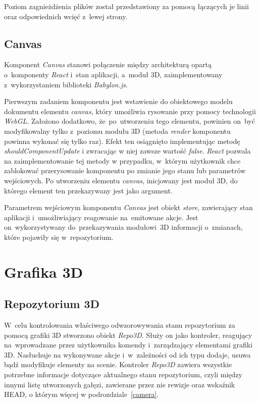 \documentclass[12pt,a4paper,polish,thesis]{dcsbook}
\begin{document}
{	Poziom zagnieżdżenia plików został przedstawiony za pomocą łączących je linii oraz odpowiednich wcięć z~lewej strony.
	\FloatBarrier

	\subsection{Canvas}

	Komponent \textit{Canvas} stanowi połączenie między architekturą opartą o~komponenty \textit{React} i~stan aplikacji, a~moduł 3D, zaimplementowany z~wykorzystaniem biblioteki \textit{Babylon.js}.

	Pierwszym zadaniem komponentu jest wstawienie do obiektowego modelu dokumentu elementu \textit{canvas}, który umożliwia rysowanie przy pomocy technologii \textit{WebGL}. Założono dodatkowo, że~po~utworzeniu tego elementu, powinien on~być modyfikowalny tylko z~poziomu modułu 3D (metoda \textit{render} komponentu powinna wykonać się tylko raz). Efekt ten osiągnięto implementując metodę \textit{shouldComponentUpdate} i zwracając w niej zawsze wartość \textit{false}. \textit{React} pozwala na zaimplementowanie tej metody w przypadku, w~którym użytkownik chce zablokować przerysowanie komponentu po zmianie jego stanu lub parametrów wejściowych. Po utworzeniu elementu \textit{canvas}, inicjowany jest moduł 3D, do którego element ten przekazywany jest jako argument.

	Parametrem wejściowym komponentu \textit{Canvas} jest obiekt \textit{store}, zawierający stan aplikacji i~umożliwiający reagowanie na~emitowane akcje. Jest on~wykorzystywany do~przekazywania modułowi~3D informacji o~zmianach, które pojawiły się w~repozytorium.

	\section{Grafika 3D}

	\subsection{Repozytorium 3D}
	W~celu kontrolowania właściwego odwzorowywania stanu repozytorium za pomocą grafiki 3D stworzono obiekt \textit{Repo3D}. Służy on jako kontroler, reagujący na~wprowadzane przez użytkownika komendy i~zarządzający elementami grafiki 3D. Nasłuchuje na wykonywane akcje i~w~zależności od ich typu dodaje, usuwa bądź modyfikuje elementy na scenie. Kontroler \textit{Repo3D} zawiera wszystkie potrzebne informacje dotyczące aktualnego stanu repozytorium, czyli między innymi listę utworzonych gałęzi, zawierane przez nie rewizje oraz wskaźnik HEAD, o którym więcej w podrozdziale~\ref{camera}.

}
\end{document}
